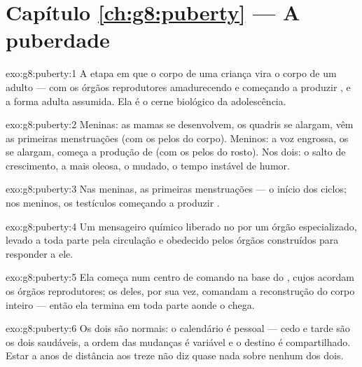 \section*{Capítulo \ref{ch:g8:puberty} --- A puberdade}

\begin{solution}{exo:g8:puberty:1}
A etapa em que o corpo de uma criança vira o corpo de um adulto --- com
os órgãos reprodutores amadurecendo e começando a produzir , e
a forma adulta assumida. Ela é o cerne biológico da adolescência.
\end{solution}

\begin{solution}{exo:g8:puberty:2}
Meninas: as mamas se desenvolvem, os quadris se alargam, vêm as
primeiras menstruações (com os pelos do corpo). Meninos: a voz
engrossa, os  se alargam, começa a produção de 
(com os pelos do rosto). Nos dois: o salto de crescimento, a  mais
oleosa, o  mudado, o tempo instável de humor.
\end{solution}

\begin{solution}{exo:g8:puberty:3}
Nas meninas, as primeiras menstruações --- o início dos ciclos; nos
meninos, os testículos começando a produzir .
\end{solution}

\begin{solution}{exo:g8:puberty:4}
Um mensageiro químico liberado no  por um órgão especializado,
levado a toda parte pela circulação e obedecido pelos órgãos
construídos para responder a ele.
\end{solution}

\begin{solution}{exo:g8:puberty:5}
Ela começa num centro de comando na base do , cujos 
acordam os órgãos reprodutores; os  deles, por sua vez,
comandam a reconstrução do corpo inteiro --- então ela termina em toda
parte aonde o  chega.
\end{solution}

\begin{solution}{exo:g8:puberty:6}
Os dois são normais: o calendário é pessoal --- cedo e tarde são os
dois saudáveis, a ordem das mudanças é variável e o destino é
compartilhado. Estar a anos de distância aos treze não diz quase nada
sobre nenhum dos dois.
\end{solution}

